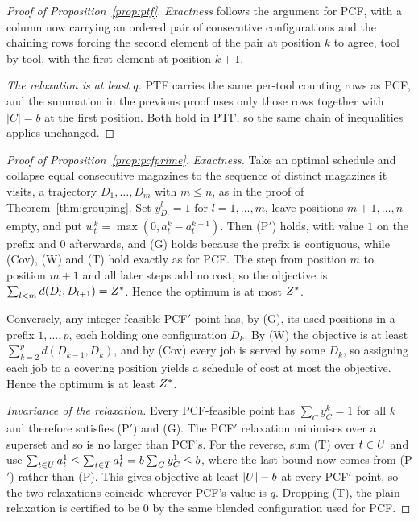 \begin{proof}[Proof of Proposition~\ref{prop:ptf}]
\emph{Exactness} follows the argument for PCF, with a column now carrying an ordered
pair of consecutive configurations and the chaining rows forcing the second element of
the pair at position $k$ to agree, tool by tool, with the first element at position
$k+1$.

\emph{The relaxation is at least $q$.} PTF carries the same per-tool counting rows as
PCF, and the summation in the previous proof uses only those rows together with
$\lvert C\rvert=b$ at the first position. Both hold in PTF, so the same chain of
inequalities applies unchanged.

\end{proof}

\begin{proof}[Proof of Proposition~\ref{prop:pcfprime}]
\emph{Exactness.} Take an optimal schedule and collapse equal consecutive magazines to
the sequence of distinct magazines it visits, a trajectory $D_1,\dots,D_m$ with
$m\le n$, as in the proof of Theorem~\ref{thm:grouping}. Set $y^{l}_{D_l}=1$ for
$l=1,\dots,m$, leave positions $m+1,\dots,n$ empty, and put
$w_t^{k}=\max(0,a_t^{k}-a_t^{k-1})$. Then (P$'$) holds, with value $1$ on the prefix
and $0$ afterwards, and (G) holds because the prefix is contiguous, while (Cov), (W)
and (T) hold exactly as for PCF. The step from position $m$ to position $m+1$ and all
later steps add no cost, so the objective is
$\sum_{l<m}d(D_l,D_{l+1})=Z^{\ast}$. Hence the optimum is at most $Z^{\ast}$.

Conversely, any integer-feasible PCF$'$ point has, by (G), its used positions in a
prefix $1,\dots,p$, each holding one configuration $D_k$. By (W) the objective is at
least $\sum_{k=2}^{p}d(D_{k-1},D_k)$, and by (Cov) every job is served by some $D_k$,
so assigning each job to a covering position yields a schedule of cost at most the
objective. Hence the optimum is at least $Z^{\ast}$.

\emph{Invariance of the relaxation.} Every PCF-feasible point has $\sum_C y_C^{k}=1$
for all $k$ and therefore satisfies (P$'$) and (G). The PCF$'$ relaxation minimises
over a superset and so is no larger than PCF's. For the reverse, sum (T) over
$t\in U$ and use
$\sum_{t\in U}a_t^{1}\le\sum_{t\in T}a_t^{1}=b\sum_C y_C^{1}\le b$, where the last
bound now comes from (P$'$) rather than (P). This gives objective at least
$\lvert U\rvert-b$ at every PCF$'$ point, so the two relaxations coincide wherever
PCF's value is $q$. Dropping (T), the plain relaxation is certified to be $0$ by the
same blended configuration used for PCF.
\end{proof}
